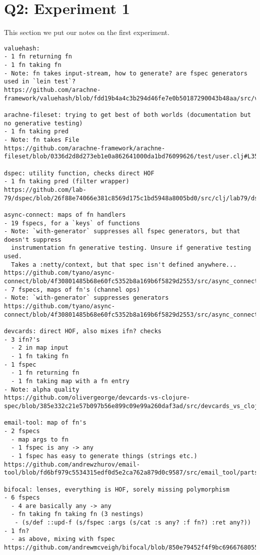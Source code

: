 \section{Q2: Experiment 1}
\label{appendix1}

This section we put our notes on the first experiment.

\begingroup
    \fontsize{5pt}{7pt}\selectfont
\begin{verbatim}
valuehash: 
- 1 fn returning fn
- 1 fn taking fn
- Note: fn takes input-stream, how to generate? are fspec generators used in `lein test`?
https://github.com/arachne-framework/valuehash/blob/fdd19b4a4c3b294d46fe7e0b50187290043b48aa/src/valuehash/specs.clj

arachne-fileset: trying to get best of both worlds (documentation but no generative testing)
- 1 fn taking pred
- Note: fn takes File
https://github.com/arachne-framework/arachne-fileset/blob/0336d2d8d273eb1e0a862641000da1bd76099626/test/user.clj#L35

dspec: utility function, checks direct HOF
- 1 fn taking pred (filter wrapper)
https://github.com/lab-79/dspec/blob/26f88e74066e381c8569d175c1bd5948a8005bd0/src/clj/lab79/dspec/util.clj

async-connect: maps of fn handlers
- 19 fspecs, for a `keys` of functions
- Note: `with-generator` suppresses all fspec generators, but that doesn't suppress
  instrumentation fn generative testing. Unsure if generative testing used.
  Takes a :netty/context, but that spec isn't defined anywhere...
https://github.com/tyano/async-connect/blob/4f30801485b68e60fc5352b8a169b6f5829d2553/src/async_connect/netty/handler.clj
- 7 fspecs, maps of fn's (channel ops)
- Note: `with-generator` suppresses generators
https://github.com/tyano/async-connect/blob/4f30801485b68e60fc5352b8a169b6f5829d2553/src/async_connect/server.clj#L46

devcards: direct HOF, also mixes ifn? checks
- 3 ifn?'s
  - 2 in map input
  - 1 fn taking fn
- 1 fspec
  - 1 fn returning fn
  - 1 fn taking map with a fn entry
- Note: alpha quality
https://github.com/olivergeorge/devcards-vs-clojure-spec/blob/385e332c21e57b097b56e899c09e99a260daf3ad/src/devcards_vs_clojure_spec/core_specs.cljc#L7

email-tool: map of fn's
- 2 fspecs
  - map args to fn
  - 1 fspec is any -> any
  - 1 fspec has easy to generate things (strings etc.)
https://github.com/andrewzhurov/email-tool/blob/fd6bf979c5534315edf0d5e2ca762a879d0c9587/src/email_tool/parts.clj#L8

bifocal: lenses, everything is HOF, sorely missing polymorphism
- 6 fspecs
  - 4 are basically any -> any
  - fn taking fn taking fn (3 nestings)
   - (s/def ::upd-f (s/fspec :args (s/cat :s any? :f fn?) :ret any?))
- 1 fn?
  - as above, mixing with fspec
https://github.com/andrewmcveigh/bifocal/blob/850e79452f4f9bc6966768055acfc7aae6671f80/src/bifocal/lens.clj#L36


\end{verbatim}
